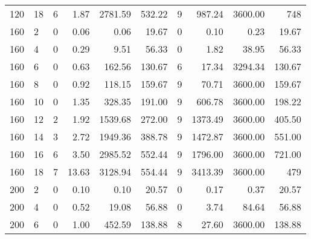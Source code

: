 \begin{appendices}
\begin{table*}[h]
\begin{center}
\begin{tabular} {l l | r r r r | r r r r}
120 & 18                                &  6           &  1.87        &  2781.59     & 532.22          &  9            &  987.24      & 3600.00      & 748         \\ 
160 & 2                                 &  0           &  0.06        &  0.06        & 19.67           &  0            &  0.10        & 0.23         & 19.67       \\ 
160 & 4                                 &  0           &  0.29        &  9.51        & 56.33           &  0            &  1.82        & 38.95        & 56.33       \\ 
160 & 6                                 &  0           &  0.63        &  162.56      & 130.67          &  6            &  17.34       & 3294.34      & 130.67      \\ 
160 & 8                                 &  0           &  0.92        &  118.15      & 159.67          &  9            &  70.71       & 3600.00      & 159.67      \\ 
160 & 10                                &  0           &  1.35        &  328.35      & 191.00          &  9            &  606.78      & 3600.00      & 198.22      \\ 
160 & 12                                &  2           &  1.92        &  1539.68     & 272.00          &  9            &  1373.49     & 3600.00      & 405.50      \\ 
160 & 14                                &  3           &  2.72        &  1949.36     & 388.78          &  9            &  1472.87     & 3600.00      & 551.00      \\ 
160 & 16                                &  6           &  3.50        &  2985.52     & 552.44          &  9            &  1796.00     & 3600.00      & 721.00      \\ 
160 & 18                                &  7           &  13.63       &  3128.94     & 554.44          &  9            &  3413.39     & 3600.00      & 479         \\ 
200 & 2                                 &  0           &  0.10        &  0.10        & 20.57           &  0            &  0.17        & 0.37         & 20.57       \\ 
200 & 4                                 &  0           &  0.52        &  19.08       & 56.88           &  0            &  3.74        & 84.64        & 56.88       \\ 
200 & 6                                 &  0           &  1.00        &  452.59      & 138.88          &  8            &  27.60       & 3600.00      & 138.88      \\ 

\end{tabular}
\end{center}
\end{table*}
\end{appendices}
